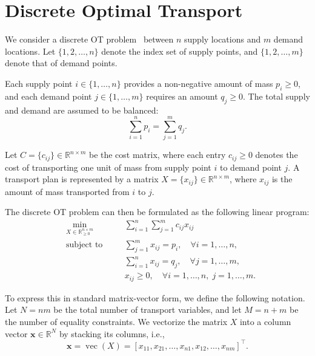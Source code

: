 \documentclass[12pt,a4paper]{article}
\begin{document}
\section{Discrete Optimal Transport}

We consider a discrete OT problem~\cite{villani2009optimal} between \( n \) supply locations and \( m \) demand locations. Let \( \{1, 2, \dots, n\} \) denote the index set of supply points, and \( \{1, 2, \dots, m\} \) denote that of demand points.

Each supply point \( i \in \{1, \dots, n\} \) provides a non-negative amount of mass \( p_i \geq 0 \), and each demand point \( j \in \{1, \dots, m\} \) requires an amount \( q_j \geq 0 \). The total supply and demand are assumed to be balanced:
\[
\sum_{i=1}^n p_i = \sum_{j=1}^m q_j.
\]

Let \( C = \{c_{ij}\} \in \mathbb{R}^{n \times m} \) be the cost matrix, where each entry \( c_{ij} \geq 0 \) denotes the cost of transporting one unit of mass from supply point \( i \) to demand point \( j \). A transport plan is represented by a matrix \( X = \{x_{ij}\} \in \mathbb{R}^{n \times m} \), where \( x_{ij} \) is the amount of mass transported from \( i \) to \( j \).

The discrete OT problem can then be formulated as the following linear program:
\begin{equation}
\label{eq:primal}
\begin{alignedat}{2}
    & \min_{X \in \mathbb{R}_{\geq 0}^{n \times m}} \quad & & \sum_{i=1}^n \sum_{j=1}^m c_{ij} x_{ij} \\
    & \text{subject to} \quad & & \sum_{j=1}^m x_{ij} = p_i, \quad \forall i = 1, \dots, n, \\
    &                         & & \sum_{i=1}^n x_{ij} = q_j, \quad \forall j = 1, \dots, m, \\
    &                         & & x_{ij} \geq 0, \quad \forall i = 1, \dots, n,\; j = 1, \dots, m.
\end{alignedat}
\end{equation}


To express this in standard matrix-vector form, we define the following notation. Let \( N = nm \) be the total number of transport variables, and let \( M = n + m \) be the number of equality constraints. We vectorize the matrix \( X \) into a column vector \( \mathbf{x} \in \mathbb{R}^{N} \) by stacking its columns, i.e.,
\[
\mathbf{x} = \operatorname{vec}(X) = [x_{11}, x_{21}, \dots, x_{n1}, x_{12}, \dots, x_{nm}]^\top.
\]
\end{document}
